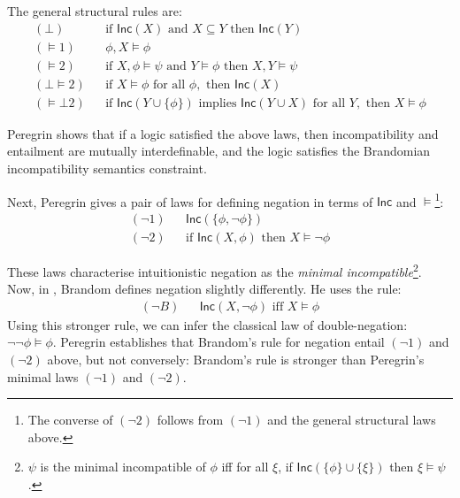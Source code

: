 \NI The general structural rules are:
\begin{eqnarray*}
  (\bot) & & \text{if } \mathsf{Inc}(X) \text{ and } X \subseteq Y \text{ then } \mathsf{Inc}(Y) \\
  (\models 1) & & \phi, X \models \phi \\
  (\models 2) & & \text{if }X, \phi \models \psi \text{ and } Y \models \phi \text{ then } X, Y \models \psi \\
  (\bot \models 2) & & \text{if } X \models \phi \text{ for all } \phi, \text{ then } \mathsf{Inc}(X) \\
  (\models \bot 2) & & \text{if } \mathsf{Inc}(Y \cup \{\phi\}) \text{ implies } \mathsf{Inc}(Y \cup X) \text{ for all } Y, \text{ then } X \models \phi
\end{eqnarray*}

\NI Peregrin shows that if a logic satisfied the above laws, then
incompatibility and entailment are mutually interdefinable, and the
logic satisfies the Brandomian incompatibility semantics constraint.

Next, Peregrin gives a pair of laws for defining negation in terms
of $\mathsf{Inc}$ and $\models$\footnote{The converse of $(\neg 2)$
  follows from $(\neg 1)$ and the general structural laws above.}:
\begin{eqnarray*}
  (\neg 1) & & \mathsf{Inc}(\{\phi, \neg \phi\}) \\
  (\neg 2) & & \text{if } \mathsf{Inc}(X, \phi) \text{ then } X \models \neg \phi
\end{eqnarray*}

\NI These laws characterise intuitionistic negation as the
\emph{minimal incompatible}\footnote{$\psi$ is the minimal
  incompatible of $\phi$ iff for all $\xi$, if $\mathsf{Inc}(\{\phi\}
  \cup \{\xi\})$ then $\xi \models \psi$.}.  
  Now, in \cite{brandom},
Brandom defines negation slightly differently. He uses the rule:
\begin{eqnarray*}
  (\neg B) & &\mathsf{Inc}(X, \neg \phi) \text{ iff } X \models \phi
\end{eqnarray*}
Using this stronger rule, we can infer the classical law of
double-negation: $\neg \neg \phi \models \phi$.  Peregrin establishes
that Brandom's rule for negation entail $(\neg 1)$ and $(\neg 2)$
above, but not conversely: Brandom's rule is stronger than Peregrin's
minimal laws $(\neg 1)$ and $(\neg 2)$.


